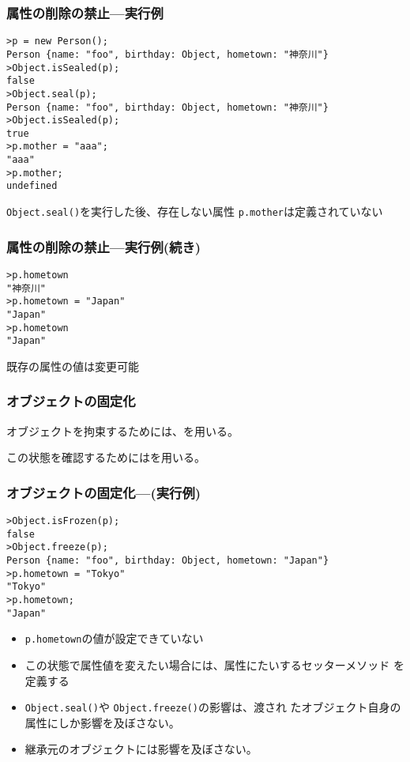 \documentclass[dvipsk]{beamer}
\begin{document}
\begin{frame}[containsverbatim]
 \frametitle{属性の削除の禁止---実行例}
\begin{verbatim}
>p = new Person();
Person {name: "foo", birthday: Object, hometown: "神奈川"}
>Object.isSealed(p);
false
>Object.seal(p);
Person {name: "foo", birthday: Object, hometown: "神奈川"}
>Object.isSealed(p);
true
>p.mother = "aaa";
"aaa"
>p.mother;
undefined
\end{verbatim}
\texttt{Object.seal()}を実行した後、存在しない属性
 \texttt{p.mother}は定義されていない
 \end{frame}
\begin{frame}[containsverbatim]
 \frametitle{属性の削除の禁止---実行例(続き)}
\begin{verbatim}
>p.hometown
"神奈川"
>p.hometown = "Japan"
"Japan"
>p.hometown
"Japan"
\end{verbatim}
 既存の属性の値は変更可能
\end{frame}
\begin{frame}[containsverbatim]
 \frametitle{オブジェクトの固定化}
 オブジェクトを拘束するためには、を用いる。

 この状態を確認するためにはを用いる。
\end{frame}
\begin{frame}[containsverbatim]
 \frametitle{オブジェクトの固定化---(実行例)}
\begin{verbatim}
>Object.isFrozen(p);
false
>Object.freeze(p);
Person {name: "foo", birthday: Object, hometown: "Japan"}
>p.hometown = "Tokyo"
"Tokyo"
>p.hometown;
"Japan"
\end{verbatim}
 \begin{itemize}
  \item  \texttt{p.hometown}の値が設定できていない
  \item この状態で属性値を変えたい場合には、属性にたいするセッターメソッド
 を定義する
  \item \texttt{Object.seal()}や \texttt{Object.freeze()}の影響は、渡され
 たオブジェクト自身の属性にしか影響を及ぼさない。
  \item 継承元のオブジェクトには影響を及ぼさない。
 \end{itemize}
 \end{frame}
\end{document}

